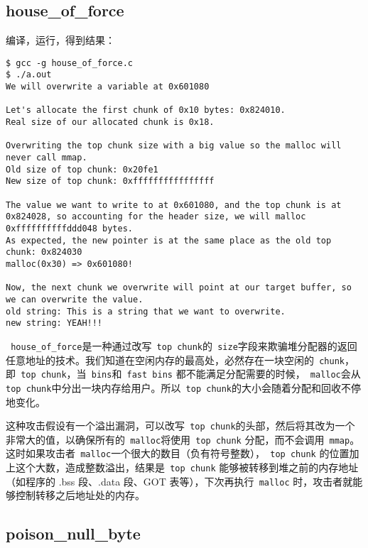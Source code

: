 \subsection{house\_of\_force}

编译，运行，得到结果：
\begin{verbatim}
$ gcc -g house_of_force.c
$ ./a.out 
We will overwrite a variable at 0x601080

Let's allocate the first chunk of 0x10 bytes: 0x824010.
Real size of our allocated chunk is 0x18.

Overwriting the top chunk size with a big value so the malloc will never call mmap.
Old size of top chunk: 0x20fe1
New size of top chunk: 0xffffffffffffffff

The value we want to write to at 0x601080, and the top chunk is at 0x824028, so accounting for the header size, we will malloc 0xffffffffffddd048 bytes.
As expected, the new pointer is at the same place as the old top chunk: 0x824030
malloc(0x30) => 0x601080!

Now, the next chunk we overwrite will point at our target buffer, so we can overwrite the value.
old string: This is a string that we want to overwrite.
new string: YEAH!!!
\end{verbatim}

\verb+ house_of_force+是一种通过改写\verb+ top chunk+的\verb+ size+字段来欺骗堆分配器的返回任意地址的技术。我们知道在空闲内存的最高处，必然存在一块空闲的\verb+ chunk+，即\verb+ top chunk+，当\verb+ bins+和\verb+ fast bins+ 都不能满足分配需要的时候，\verb+ malloc+会从\verb+ top chunk+中分出一块内存给用户。所以\verb+ top chunk+的大小会随着分配和回收不停地变化。

这种攻击假设有一个溢出漏洞，可以改写\verb+ top chunk+的头部，然后将其改为一个非常大的值，以确保所有的\verb+ malloc+将使用\verb+ top chunk+ 分配，而不会调用\verb+ mmap+。这时如果攻击者\verb+ malloc+一个很大的数目（负有符号整数），\verb+ top chunk+ 的位置加上这个大数，造成整数溢出，结果是\verb+ top chunk+ 能够被转移到堆之前的内存地址（如程序的 .bss 段、.data 段、GOT 表等），下次再执行\verb+ malloc+ 时，攻击者就能够控制转移之后地址处的内存。

\subsection{poison\_null\_byte}


